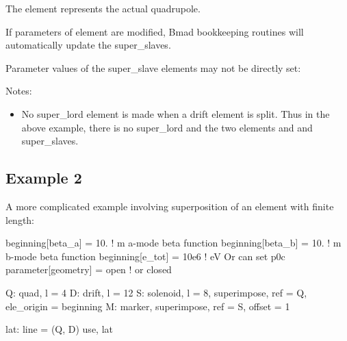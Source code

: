 \documentclass{hitec}
\begin{document}
The   element represents the actual quadrupole.
{\small
{}}

If parameters of element  are modified, Bmad bookkeeping routines will automatically update the super_slaves.
{\small
{}}

Parameter values of the super_slave elements may not be directly set:
{\small
{}}

Notes:
\begin{itemize}
\item No super_lord element is made when a drift element is split. Thus in the above example, there is no  super_lord and
the two elements  and  and  super_slaves.
\end{itemize}

\subsection{Example 2}


A more complicated example involving superposition of an element with finite length:
{\small
\begin{code}
beginning[beta_a] = 10.   ! m  a-mode beta function
beginning[beta_b] = 10.   ! m  b-mode beta function
beginning[e_tot] = 10e6   ! eV   Or can set p0c
parameter[geometry] = open      ! or closed

Q: quad, l = 4
D: drift, l = 12
S: solenoid, l = 8, superimpose, ref = Q, ele_origin = beginning
M: marker, superimpose, ref = S, offset = 1

lat: line = (Q, D)
use, lat
\end{code}}
\end{document}
